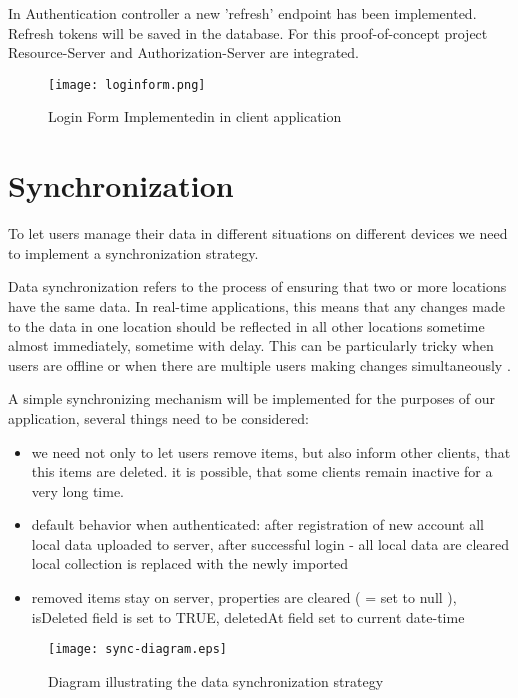 In Authentication controller a new 'refresh' endpoint has been implemented. Refresh tokens will be saved in the database. For this proof-of-concept project Resource-Server and Authorization-Server are integrated.

\begin{figure}[H]
    \centering
    \texttt{[image: loginform.png]}
    \caption[Proof-of-concept Login form]{\label{fig:} Login Form Implementedin in client application }
\end{figure}


\section{{Synchronization}}%
\label{sec:synchronization}

To let users manage their data in different situations on different devices we need to implement a synchronization strategy. 

Data synchronization refers to the process of ensuring that two or more locations have the same data. In real-time applications, this means that any changes made to the data in one location should be reflected in all other locations sometime almost immediately, sometime with delay. This can be particularly tricky when users are offline or when there are multiple users making changes simultaneously \autocite{SyncPeerDH}.

A simple synchronizing mechanism will be implemented for the purposes of our application, several things need to be considered:
\begin{itemize}
    \item we need not only to let users remove items, but also inform other clients, that this items are deleted. it is possible, that some clients remain inactive for a very long time.
    \item default behavior when authenticated: after registration of new account all local data uploaded to server, after successful login - all local data are cleared local collection is replaced with the newly imported
    \item removed items stay on server, properties are cleared ( = set to null ), isDeleted field is set to TRUE, deletedAt field set to current date-time
\end{itemize}

\begin{figure}[H]
    \centering
    \texttt{[image: sync-diagram.eps]}
    \caption[Synchronization strategy diagram]{\label{fig:} Diagram illustrating the data synchronization strategy  }
\end{figure}

